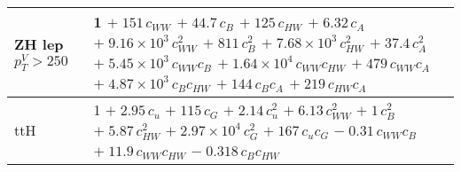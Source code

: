 \begin{tabular}{l|p{}}
    ZH lep $p_{T}^{V} > 250$ & 1 $+\;151\,c_{WW}$ $+\;44.7\,c_{B}$ $+\;125\,c_{HW}$ $+\;6.32\,c_{A}$ $+\;9.16\times 10^{3}\,c_{WW}^{2}$ $+\;811\,c_{B}^{2}$ $+\;7.68\times 10^{3}\,c_{HW}^{2}$ $+\;37.4\,c_{A}^{2}$ $+\;5.45\times 10^{3}\,c_{WW}c_{B}$ $+\;1.64\times 10^{4}\,c_{WW}c_{HW}$ $+\;479\,c_{WW}c_{A}$ $+\;4.87\times 10^{3}\,c_{B}c_{HW}$ $+\;144\,c_{B}c_{A}$ $+\;219\,c_{HW}c_{A}$ \\
    \hline
    ttH & 1 $+\;2.95\,c_{u}$ $+\;115\,c_{G}$ $+\;2.14\,c_{u}^{2}$ $+\;6.13\,c_{WW}^{2}$ $+\;1\,c_{B}^{2}$ $+\;5.87\,c_{HW}^{2}$ $+\;2.97\times 10^{4}\,c_{G}^{2}$ $+\;167\,c_{u}c_{G}$ $-\;0.31\,c_{WW}c_{B}$ $+\;11.9\,c_{WW}c_{HW}$ $-\;0.318\,c_{B}c_{HW}$ \\
    \hline
\end{tabular}